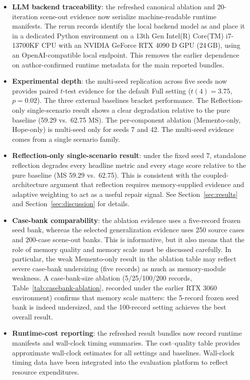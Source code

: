 \begin{itemize}
\item \textbf{LLM backend traceability}: the refreshed canonical ablation and 20-iteration scene-out evidence now serialize machine-readable runtime manifests. The rerun records identify the local backend model as  and place it in a dedicated Python environment on a 13th Gen Intel(R) Core(TM) i7-13700KF CPU with an NVIDIA GeForce RTX 4090 D GPU (24\,GB), using an OpenAI-compatible local endpoint. This removes the earlier dependence on author-confirmed runtime metadata for the main reported bundles.
\item \textbf{Experimental depth}: the multi-seed replication across five seeds now provides paired $t$-test evidence for the default Full setting ($t(4)=3.75$, $p=0.02$). The three external baselines bracket performance. The Reflection-only single-scenario result shows a clear degradation relative to the pure baseline (59.29 vs.\ 62.75 MS). The per-component ablation (Memento-only, Hope-only) is multi-seed only for seeds 7 and 42. The multi-seed evidence comes from a single scenario family.
	\item \textbf{Reflection-only single-scenario result}: under the fixed seed 7, standalone reflection degrades every headline metric and every stage score relative to the pure baseline (MS 59.29 vs.\ 62.75). This is consistent with the coupled-architecture argument that reflection requires memory-supplied evidence and adaptive weighting to act as a useful repair signal. See Section~\ref{sec:results} and Section~\ref{sec:discussion} for details.
\item \textbf{Case-bank comparability}: the ablation evidence uses a five-record frozen seed bank, whereas the selected generalization evidence uses 250 source cases and 200-case scene-out banks. This is informative, but it also means that the role of memory quality and memory scale must be discussed carefully. In particular, the weak Memento-only result in the ablation table may reflect severe case-bank undersizing (five records) as much as memory-module weakness. A case-bank-size ablation (5/25/100/200 records, Table~\ref{tab:casebank-ablation}, recorded under the earlier RTX 3060 environment) confirms that memory scale matters: the 5-record frozen seed bank is indeed undersized, and the 100-record setting achieves the best overall result.
\item \textbf{Runtime-cost reporting}: the refreshed result bundles now record runtime manifests and wall-clock timing summaries. The cost--quality table provides approximate wall-clock estimates for all settings and baselines. Wall-clock timing data have been integrated into the evaluation platform to reflect resource expenditures.

\end{itemize}
